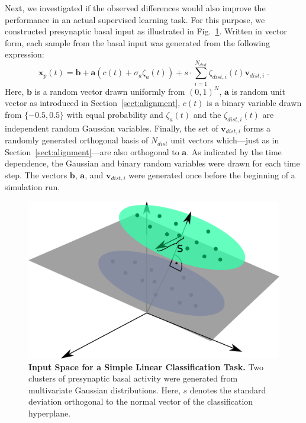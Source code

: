 \documentclass[10pt,a4paper,twocolumn]{article}
\begin{document}
		Next, we investigated if the observed differences would also improve
		the performance in an actual supervised learning task.
		For this purpose, we constructed presynaptic basal input as illustrated
		in Fig.~\ref{fig:illustration_classification}. Written in vector form,
		each sample from the basal input was generated from the following expression:
		\begin{equation}
			\mathbf{x}_p(t) = \mathbf{b} + \mathbf{a}\left(c(t) + \sigma_a \zeta_a(t) \right) 
			+ s \cdot \sum_{i=1}^{N_{dist}} \zeta_{dist,i}(t) \mathbf{v}_{dist,i} \; .
		\end{equation}
		Here, $\mathbf{b}$ is a random vector drawn uniformly from
		$(0,1)^N$, $\mathbf{a}$ is random unit vector as introduced in 
		Section~\ref{sect:alignment}, $c(t)$ is a binary variable drawn 
		from $\{-0.5,0.5\}$ with equal probability and $\zeta_a(t)$ and the
		$\zeta_{dist,i}(t)$ are independent random Gaussian variables.
		Finally, the set of $\mathbf{v}_{dist,i}$ forms a randomly generated
		orthogonal basis of $N_{dist}$ unit vectors which---just as in 
		Section~\ref{sect:alignment}---are also orthogonal to $\mathbf{a}$.
		As indicated by the time dependence, the Gaussian and binary random
		variables were drawn for each time step. The vectors
		$\mathbf{b}$, $\mathbf{a}$, and $\mathbf{v}_{dist,i}$ were generated
		once before the beginning of a simulation run.
		
		
		
	
		
		\begin{figure}
			\centering
			\includegraphics[width=0.75\columnwidth]{illustration_classification}
			\caption{{\bf Input Space for a Simple Linear Classification Task.}
			Two clusters of presynaptic basal activity were generated from 
			multivariate Gaussian distributions. Here, $s$ denotes the standard
			deviation orthogonal to the normal vector of the classification
			hyperplane.}
			\label{fig:illustration_classification}
		\end{figure}
		
		
		
		
		
		
		
		
		
\end{document}
